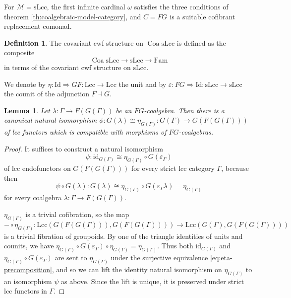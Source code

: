 \documentclass[a4paper]{article}
\newtheorem{lemma}[theorem]{Lemma}
\theoremstyle{remark}
\theoremstyle{definition}
\newtheorem{definition}[theorem]{Definition}
\begin{document}
For $\mathcal{M} = \mathrm{sLcc}$, the first infinite cardinal $\omega$ satisfies the three conditions of theorem \ref{th:coalgebraic-model-category}, and $C = FG$ is a suitable cofibrant replacement comonad.

\begin{definition}
  The covariant cwf structure on $\operatorname{Coa} \mathrm{sLcc}$ is defined as the composite
  \begin{equation}
    \operatorname{Coa} \mathrm{sLcc} \rightarrow \mathrm{sLcc} \rightarrow \mathrm{Fam}
  \end{equation}
  in terms of the covariant cwf structure on $\mathrm{sLcc}$.
\end{definition}

We denote by $\eta : \mathrm{Id} \Rightarrow G F : \mathrm{Lcc} \rightarrow \mathrm{Lcc}$ the unit and by $\varepsilon : F G \Rightarrow \mathrm{Id} : \mathrm{sLcc} \rightarrow \mathrm{sLcc}$ the counit of the adjunction $F \dashv G$.

\begin{lemma}
  \label{lem:coalgebra-vs-eta}
  Let $\lambda : \Gamma \rightarrow F(G(\Gamma))$ be an $FG$-coalgebra.
  Then there is a canonical natural isomorphism $\phi : G(\lambda) \cong \eta_{G(\Gamma)} : G(\Gamma) \rightarrow G(F(G(\Gamma)))$ of lcc functors which is compatible with morphisms of $FG$-coalgebras.
\end{lemma}
\begin{proof}
  It suffices to construct a natural isomorphism
  \begin{equation}
    \psi : \mathrm{id}_{G(\Gamma)} \cong \eta_{G(\Gamma)} \circ G(\varepsilon_\Gamma)
  \end{equation}
  of lcc endofunctors on $G(F(G(\Gamma)))$ for every strict lcc category $\Gamma$, because then
  \begin{equation}
    \psi \circ G(\lambda) : G(\lambda) \cong \eta_{G(\Gamma)} \circ G(\varepsilon_\Gamma \lambda) = \eta_{G(\Gamma)}
  \end{equation}
  for every coalgebra $\lambda : \Gamma \rightarrow F(G(\Gamma))$.

  $\eta_{G(\Gamma)}$ is a trivial cofibration, so the map
  \begin{equation}
    \label{eq:eta-precomposition}
    - \circ \eta_{G(\Gamma)} : \mathrm{Lcc}(G(F(G(\Gamma))), G(F(G(\Gamma)))) \rightarrow \mathrm{Lcc}(G(\Gamma), G(F(G(\Gamma)))) 
  \end{equation}
  is a trivial fibration of groupoids.
  By one of the triangle identities of units and counits, we have $\eta_{G(\Gamma)} \circ G(\varepsilon_\Gamma) \circ \eta_{G(\Gamma)} = \eta_{G(\Gamma)}$.
  Thus both $\mathrm{id}_{G(\Gamma)}$ and $\eta_{G(\Gamma)} \circ G(\varepsilon_\Gamma)$ are sent to $\eta_{G(\Gamma)}$ under the surjective equivalence \eqref{eq:eta-precomposition}, and so we can lift the identity natural isomorphism on $\eta_{G(\Gamma)}$ to an isomorphism $\psi$ as above.
  Since the lift is unique, it is preserved under strict lcc functors in $\Gamma$.
\end{proof}
\end{document}
